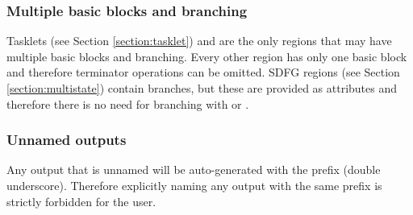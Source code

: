 \subsubsection{Multiple basic blocks and branching}
Tasklets (see Section \ref{section:tasklet}) and  are the only regions that may have multiple basic blocks and branching. Every other region has only one basic block and therefore terminator operations can be omitted. SDFG regions (see Section \ref{section:multistate}) contain branches, but these are provided as attributes and therefore there is no need for branching with  or .

\subsubsection{Unnamed outputs}
Any output that is unnamed will be auto-generated with the prefix \codeword{__} (double underscore). Therefore explicitly naming any output with the same prefix is strictly forbidden for the user.